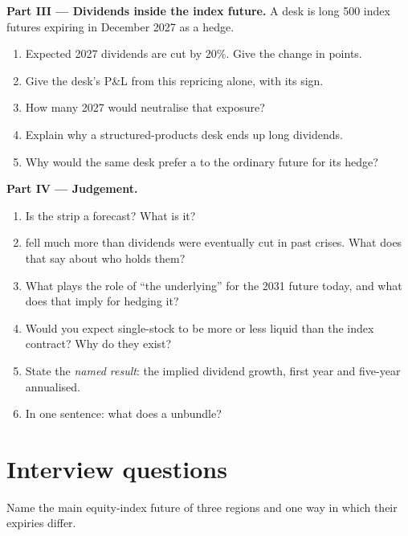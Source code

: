 \begin{problem}
\medskip\noindent\textbf{Part III --- Dividends inside the index future.}
A desk is long 500 index futures expiring in December 2027 as a hedge.
\begin{enumerate}[resume]
\item Expected 2027 dividends are cut by 20\%. Give the change in points.
\item Give the desk's P\&L from this repricing alone, with its sign.
\item How many 2027  would neutralise that exposure?
\item Explain why a structured-products desk ends up long dividends.
\item Why would the same desk prefer a  to the ordinary
future for its hedge?
\end{enumerate}

\medskip\noindent\textbf{Part IV --- Judgement.}
\begin{enumerate}[resume]
\item Is the strip a forecast? What is it?
\item {} fell much more than dividends were eventually cut in
past crises. What does that say about who holds them?
\item What plays the role of ``the underlying'' for the 2031 future today,
and what does that imply for hedging it?
\item Would you expect single-stock  to be more or less
liquid than the index contract? Why do they exist?
\item State the \emph{named result}: the implied dividend growth, first year
and five-year annualised.
\item In one sentence: what does a  unbundle?
\end{enumerate}
\end{problem}

\section{Interview questions}

\begin{interviewq}\label{iq:m1:index-and-single-stock-futures-worldwide:1}
Name the main equity-index future of three regions and one way in which
their expiries differ.
\end{interviewq}

